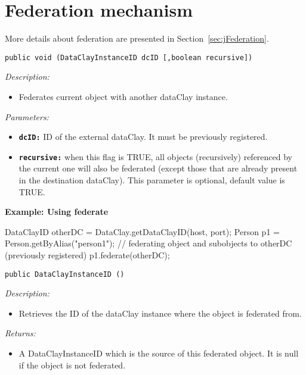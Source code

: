 \section{Federation mechanism}
\label{sec:JavaObjectFederation}

More details about federation are presented in Section~\ref{sec:jFederation}.

\begin{dBox}
\texttt{public void (DataClayInstanceID dcID [,boolean recursive])}
\LINE

{\it Description:}

\begin{itemize}
  \item Federates current object with another dataClay instance. 
\end{itemize}

{\it Parameters:}

\begin{itemize}
  \item \texttt{\bfseries dcID:} ID of the external dataClay. It must be previously registered.
  \item \texttt{\bfseries recursive:} when this flag is TRUE, all objects (recursively) referenced by the current one will also be federated (except those that are already present in the destination dataClay). This parameter is optional, default value is TRUE.
\end{itemize}

\end{dBox}

\begin{tBox}
\textcolor{basecolor} {\bf Example: Using federate}
\begin{java}
DataClayID otherDC = DataClay.getDataClayID(host, port);
Person p1 = Person.getByAlias("person1");
// federating object and subobjects to otherDC (previously registered)
p1.federate(otherDC);
\end{java}
\end{tBox}


\begin{dBox}
\texttt{public DataClayInstanceID ()}
\LINE

{\it Description:}

\begin{itemize}
 \item Retrieves the ID of the dataClay instance where the object is federated from. 
\end{itemize}

{\it Returns:}

\begin{itemize}
 \item A DataClayInstanceID which is the source of this federated object.  
 It is null if the object is not federated.
\end{itemize}

\end{dBox}

